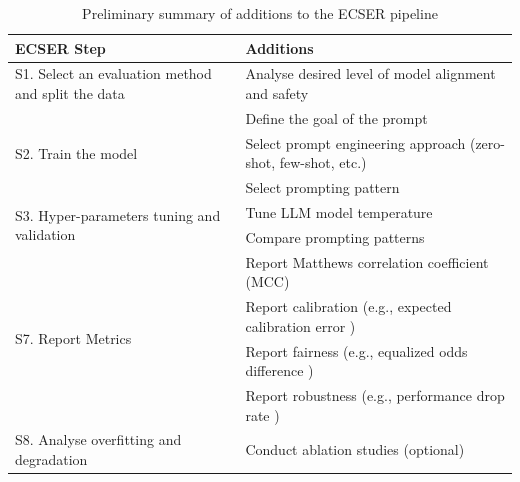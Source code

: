 \documentclass[a4paper]{article}
\begin{document}
\begin{table}[H]
    \centering
    \caption{Preliminary summary of additions to the ECSER pipeline}
    \begin{tabularx}{\textwidth}{|p{4cm}|X|}
    \hline
    \textbf{ECSER Step} & \textbf{Additions} \\ \hline
    S1. Select an evaluation method and split the data             & Analyse desired level of model alignment and safety \cite{guo2023survey} \\ \hline
    \multirow[c]{3}{=}{S2. Train the model}                        & Define the goal of the prompt \cite{Marvin2024,arvidsson2023} \\ 
                                                                   & Select prompt engineering approach (zero-shot, few-shot, etc.)  \cite{hou2024,arvidsson2023} \\ 
                                                                   & Select prompting pattern \cite{white2023,arvidsson2023} \\ \hline
    \multirow[c]{2}{=}{S3. Hyper-parameters tuning and validation} & Tune LLM model temperature \cite{peeperkorn2024} \\ 
                                                                   & Compare prompting patterns \cite{ronanki2023} \\ \hline
    \multirow[c]{4}{=}{S7. Report Metrics}                         & Report Matthews correlation coefficient (MCC) \cite{Chicco2020,Foody2023,Yao2020} \\ 
                                                                   & Report calibration (e.g., expected calibration error \cite{Pakdaman2015}) \\ 
                                                                   & Report fairness (e.g., equalized odds difference \cite{Woodworth2017}) \\ 
                                                                   & Report robustness (e.g., performance drop rate \cite{zhu2024}) \\ \hline
    S8. Analyse overfitting and degradation						   & Conduct ablation studies (optional) \cite{meyes2019ablation} \\ \hline
    \end{tabularx}
    
    \label{table:additions}
\end{table}
\end{document}
